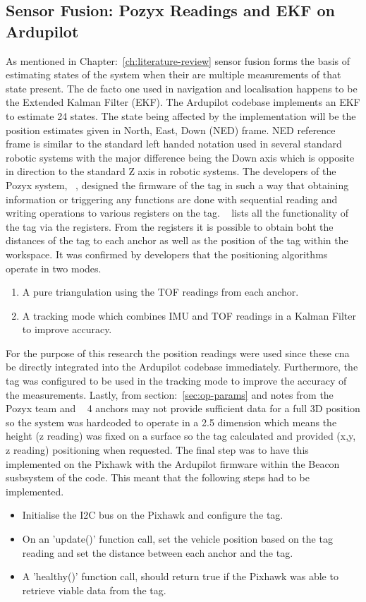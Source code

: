 \subsection{Sensor Fusion: Pozyx Readings and EKF on Ardupilot}\label{subsec:sensor-fusion}
As mentioned in Chapter:~\ref{ch:literature-review} sensor fusion forms the basis of estimating states of the system when their are multiple measurements of that state present.
The de facto one used in navigation and localisation happens to be the Extended Kalman Filter (EKF).
The Ardupilot codebase implements an EKF to estimate 24 states.
The state being affected by the implementation will be the position estimates given in North, East, Down (NED) frame.
NED reference frame is similar to the standard left handed notation used in several standard robotic systems with the major difference being the Down axis which is opposite in direction to the standard Z axis in robotic systems.
The developers of the Pozyx system, ~\cite{pozyx2018pozyx}, designed the firmware of the tag in such a way that obtaining information or triggering any functions are done with sequential reading and writing operations to various registers on the tag.
~\citet{devregs} lists all the functionality of the tag via the registers.
From the registers it is possible to obtain boht the distances of the tag to each anchor as well as the position of the tag within the workspace.
It was confirmed by developers that the positioning algorithms operate in two modes.
\begin{enumerate}
    \item A pure triangulation using the TOF readings from each anchor.
    \item A tracking mode which combines IMU and TOF readings in a Kalman Filter to improve accuracy.
\end{enumerate}
For the purpose of this research the position readings were used since these cna be directly integrated into the Ardupilot codebase immediately.
Furthermore, the tag was configured to be used in the tracking mode to improve the accuracy of the measurements.
Lastly, from section:~\ref{sec:op-params} and notes from the Pozyx team and ~\citet{evaluwb} 4 anchors may not provide sufficient data for a full 3D position so the system was hardcoded to operate in a 2.5 dimension which means the height (z reading) was fixed on a surface so the tag calculated and provided (x,y, z reading) positioning when requested.
The final step was to have this implemented on the Pixhawk with the Ardupilot firmware within the Beacon susbsystem of the code.
This meant that the following steps had to be implemented.
\begin{itemize}
    \item Initialise the I2C bus on the Pixhawk and configure the tag.
    \item On an 'update()' function call, set the vehicle position based on the tag reading and set the distance between each anchor and the tag.
    \item A 'healthy()' function call, should return true if the Pixhawk was able to retrieve viable data from the tag.
\end{itemize}

